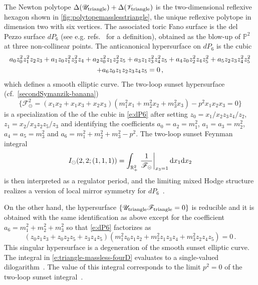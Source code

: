 \documentclass[12pt,a4paper]{article}
\theoremstyle{plain}
\theoremstyle{remark}
\newcommand{\dd}{\mathrm{d}}
\newcommand{\cU}{\mathscr {U}}
\newcommand{\cF}{\mathscr {F}}
\newcommand{\cV}{\mathscr {V}}
\newcommand{\Newton}{\Delta}
\begin{document}
The Newton polytope $\Newton(\cU_{\rm triangle})+\Newton(\cV_{\rm triangle})$
is the two-dimensional reflexive
hexagon shown in \cref{fig:polytopemasslesstriangle}, the unique reflexive polytope in dimension two with six
vertices.  The associated toric Fano surface is the del Pezzo surface
$dP_6$ (see e.g. refs.~\cite{Manin1986cubic,Dolgachev_CAG} for a definition), obtained as the blow-up of $\mathbb{P}^2$ at three non-collinear
points. The 
anticanonical hypersurface on $dP_6$ is the cubic
\begin{multline}\label{e:dP6}
  a_{0} z_{0}^2 z_{1}^2 z_{2} z_{3}+a_{1} z_{0} z_{1}^2
   z_{3}^2 z_{4}+a_{2} z_{0}^2 z_{1} z_{2}^2 z_{5}+a_{3}
   z_{1} z_{3}^2 z_{4}^2 z_{5}+a_{4} z_{0} z_{2}^2 z_{4}
   z_{5}^2+a_{5} z_{2} z_{3} z_{4}^2 z_{5}^2\cr+a_{6} z_{0}
   z_{1} z_{2} z_{3} z_{4} z_{5}=0\, ,
\end{multline}
which defines a smooth elliptic curve.
The two-loop sunset hypersurface (cf.\ \cref{secondSymanzik-banana})
\begin{equation}
\{\cF_{\circleddash}^2=(x_1x_2+x_1x_3+x_2x_3)(m_1^2x_1+m_2^2x_2+m_3^2x_3)-p^2x_1x_2x_3=0\}
\end{equation}
is a specialization of the of the cubic in \cref{e:dP6} 
after setting $z_0 = x_1/x_2 z_3 z_4/z_2$, $ z_1 = x_2/x_3 z_2 z_5/z_3$ and  identifying the coefficients $a_0=a_2=m_1^2$, $a_1=a_3=m_2^2$, $a_4=a_5=m_3^2$ and $a_6=m_1^2+m_2^2+m_3^2-p^2$.
The two-loop sunset Feynman integral 
\begin{equation}
    I_{\circleddash}(2,2;(1,1,1))=\int_{\mathbb R_+^2}\left.{1\over \cF_{\circleddash}}\right|_{x_3=1} \dd x_1\dd x_2
\end{equation}
is then interpreted as a
regulator period, and the limiting mixed Hodge structure realizes a
version of local mirror symmetry for $dP_6$~\cite{Bloch:2016izu}.

\medskip

On the other hand, the hypersurface $\{\cU_{\rm triangle}\cF_{\rm triangle}=0\}$
is reducible  and it is obtained with the same identification as above except for the coefficient $a_6=m_1^2+m_2^2+m_3^2$ so that \cref{e:dP6} factorizes as
\begin{equation}
    (z_{0} z_{1} z_{3}+z_{0} z_{2} z_{5}+z_{3} z_{4}
   z_{5}) \left(m_{1}^2 z_{0} z_{1} z_{2}+m_{2}^2 z_{1}
   z_{3} z_{4}+m_{3}^2 z_{2} z_{4} z_{5}\right)=0\,.
\end{equation}
This singular hypersurface  is a degeneration
of the smooth sunset elliptic curve.
%
The integral in \cref{e:triangle-massless-fourD} evaluates to a single-valued
dilogarithm~\cite{Chavez:2012kn}. The value of this integral corresponds to the limit
$p^2=0$ of the two-loop sunset integral~\cite{Bloch:2013tra}. 
\end{document}
